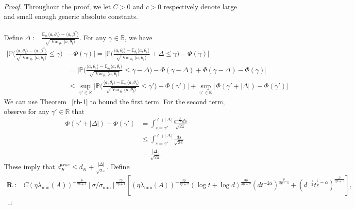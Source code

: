 \documentclass[11pt, reqno,english]{amsart}
\DeclareMathOperator{\Var}{Var} \DeclareMathOperator{\N}{N}
\begin{document}
\begin{proof}
Throughout the proof, we let $C> 0$ and $c > 0$ respectively denote large and small enough generic absolute constants.
\\\\
Define $\Delta := \frac{\mathbb{E}_{\theta_t}\langle a, \theta_t \rangle - \langle a, \beta^* \rangle}{\sqrt{\Var_{\theta_t} \langle a, \theta_t \rangle}}$. For any $\gamma \in \mathbb{R}$, we have
\begin{align*}
\bigg|\mathbb{P}\bigg(\frac{\langle a, \theta_t \rangle - \langle a, \beta^* \rangle}{\sqrt{\Var_{\theta_t} \langle a, \theta_t \rangle}} \leq \gamma\bigg)& - \Phi(\gamma)\bigg| 
= \bigg|\mathbb{P}\bigg(\frac{\langle a, \theta_t \rangle - \mathbb{E}_{\theta_t}\langle a, \theta_t \rangle}{\sqrt{\Var_{\theta_t} \langle a, \theta_t \rangle}} + \Delta \leq \gamma\bigg) - \Phi(\gamma)\bigg|
\\
&= \bigg|\mathbb{P}\bigg(\frac{\langle a, \theta_t \rangle - \mathbb{E}_{\theta_t}\langle a, \theta_t \rangle}{\sqrt{\Var_{\theta_t} \langle a, \theta_t \rangle}} \leq \gamma - \Delta \bigg) - \Phi(\gamma - \Delta) + \Phi(\gamma - \Delta) - \Phi(\gamma)\bigg|
\\
&\leq \sup_{\gamma' \in \mathbb{R}} \bigg|\mathbb{P}\bigg(\frac{\langle a, \theta_t \rangle - \mathbb{E}_{\theta_t}\langle a, \theta_t \rangle}{\sqrt{\Var_{\theta_t} \langle a, \theta_t \rangle}} \leq \gamma'\bigg) - \Phi(\gamma')\bigg| + \sup_{\gamma' \in \mathbb{R}}|\Phi(\gamma' + |\Delta|) - \Phi(\gamma')|
\end{align*}
We can use Theorem ~\ref{th-1} to bound the first term. For the second term, observe for any $\gamma' \in \mathbb{R}$ that
\begin{align*}
\Phi(\gamma' + |\Delta|) - \Phi(\gamma') &= \int_{s = \gamma'}^{\gamma' + |\Delta|} \frac{e^{-\frac{s^2}{2}} ds}{\sqrt{2\pi}}
\\
&\leq \int_{s = \gamma'}^{\gamma' + |\Delta|} \frac{ds}{\sqrt{2\pi}}
\\
&= \frac{|\Delta|}{\sqrt{2\pi}}.
\end{align*}
These imply that $d^{true}_K \leq d_K + \frac{|\Delta|}{\sqrt{2\pi}}$. Define
\begin{align*}
    \mathbf{R}:= C(\eta \lambda_{\min}(A))^{-\frac{p}{2p+1}}[\sigma/\sigma_{\min}]^{\frac{2p}{2p+1}}[(\eta \lambda_{\min}(A))^{-\frac{3p}{4p+2}}(\log t + \log d)^{\frac{3p}{4p+2}}(dt^{-2\alpha})^{\frac{p}{8p+4}} + (d^{-\frac{1}{2}}t^{\frac{1}{p}-\alpha})^{\frac{p}{2p+1}}],
\end{align*}

\end{proof}
\end{document}

